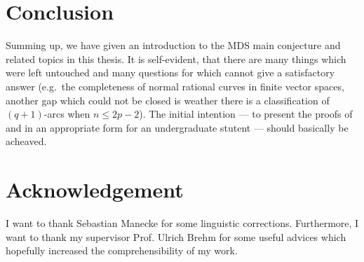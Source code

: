 \section*{Conclusion}

Summing up, we have given an introduction to the MDS main conjecture and related topics in this thesis.
It is self-evident, that there are many things which were left untouched and many questions for which cannot give a satisfactory answer (e.g.~the completeness of normal rational curves in finite vector spaces, another gap which could not be closed is weather there is a classification of $(q+1)$-arcs when $n\leq 2p-2$).
The initial intention --- to present the proofs of  and  in an appropriate form for an undergraduate stutent --- should basically be acheaved.


\section*{Acknowledgement}
I want to thank Sebastian Manecke for some linguistic corrections.
Furthermore, I want to thank my supervisor Prof. Ulrich Brehm for some useful advices which hopefully increased the comprehensibility of my work.